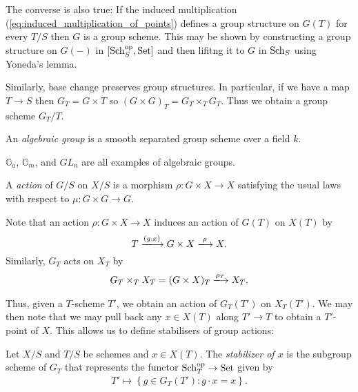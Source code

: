 \documentclass{article}
\begin{document}
The converse is also true: If the induced multiplication
(\ref{eq:induced_multiplication_of_points}) defines a group structure
on $G(T)$ for every $T/S$ then $G$ is a group scheme. This may be
shown by constructing a group structure on $G(-)$ in
$[{\operatorname{Sch}}^\text{op}_S,\operatorname{Set}]$ and then lifitng it to $G$ in $\operatorname{Sch}_S$ using
Yoneda's lemma.

Similarly, base change preserves group structures.
In particular, if we have a map $T\to S$ then $G_T = G\times T$
so $(G\times G)_T = G_T \times_T G_T$. Thus we obtain a group
scheme $G_T/T$.

\begin{definition}
  An \emph{algebraic group} is a smooth separated
  group scheme over a field $k$.
\end{definition}

\begin{example}
  $\mathbb{G}_a$, $\mathbb{G}_m$, and $GL_n$ are all examples of algebraic
  groups. \missingproof
\end{example}

\begin{definition}
  A \emph{action} of $G/S$ on $X/S$ is a morphism
  $\rho : G\times X\to X$ satisfying the usual laws with respect
  to $\mu:G\times G\to G$.

\end{definition}

Note that an action $\rho : G\times X\to X$ induces an action of
$G(T)$ on $X(T)$ by
\begin{equation*}
  T \xlongrightarrow{(g,x)} G\times X \xlongrightarrow{\rho} X.
\end{equation*}
Similarly, $G_T$ acts on $X_T$ by
\begin{align*}
  G_T \times_T X_T = (G \times X)_T \xlongrightarrow{\rho_T} X_T.
\end{align*}

Thus, given a $T$-scheme $T'$, we obtain an action of
$G_T(T')$ on $X_T(T')$. We may then note that we may pull back
any $x\in X(T)$ along $T'\to T$ to obtain a $T'$-point of $X$.
This allows us to define stabilisers of group actions:

\begin{definition}
  Let $X/S$ and $T/S$ be schemes and $x\in X(T)$. The
  \emph{stabilizer of $x$} is the subgroup scheme of $G_T$
  that represents the functor ${\operatorname{Sch}}^\text{op}_T \to \operatorname{Set}$ given by 
  \begin{align*}
    T' \mapsto \left\lbrace{ g \in G_T(T') : g\cdot x = x}\right\rbrace.
  \end{align*}
\end{definition}
\end{document}
